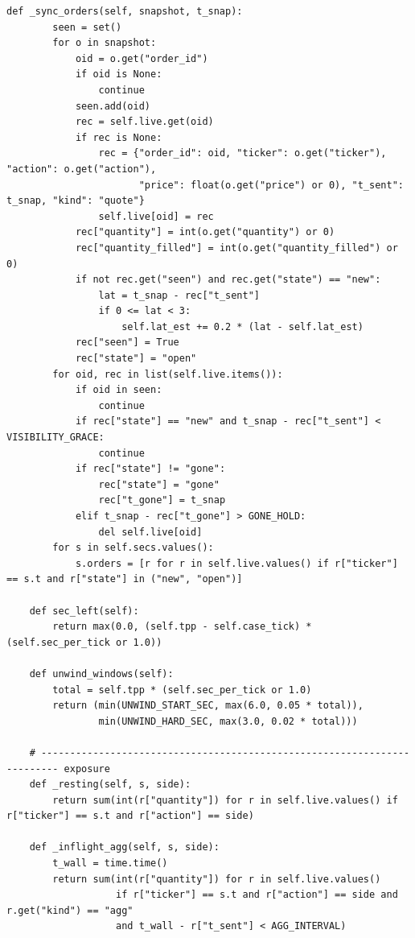 \begin{lstlisting}[style=algocode]
    def _sync_orders(self, snapshot, t_snap):
        seen = set()
        for o in snapshot:
            oid = o.get("order_id")
            if oid is None:
                continue
            seen.add(oid)
            rec = self.live.get(oid)
            if rec is None:
                rec = {"order_id": oid, "ticker": o.get("ticker"), "action": o.get("action"),
                       "price": float(o.get("price") or 0), "t_sent": t_snap, "kind": "quote"}
                self.live[oid] = rec
            rec["quantity"] = int(o.get("quantity") or 0)
            rec["quantity_filled"] = int(o.get("quantity_filled") or 0)
            if not rec.get("seen") and rec.get("state") == "new":
                lat = t_snap - rec["t_sent"]
                if 0 <= lat < 3:
                    self.lat_est += 0.2 * (lat - self.lat_est)
            rec["seen"] = True
            rec["state"] = "open"
        for oid, rec in list(self.live.items()):
            if oid in seen:
                continue
            if rec["state"] == "new" and t_snap - rec["t_sent"] < VISIBILITY_GRACE:
                continue
            if rec["state"] != "gone":
                rec["state"] = "gone"
                rec["t_gone"] = t_snap
            elif t_snap - rec["t_gone"] > GONE_HOLD:
                del self.live[oid]
        for s in self.secs.values():
            s.orders = [r for r in self.live.values() if r["ticker"] == s.t and r["state"] in ("new", "open")]

    def sec_left(self):
        return max(0.0, (self.tpp - self.case_tick) * (self.sec_per_tick or 1.0))

    def unwind_windows(self):
        total = self.tpp * (self.sec_per_tick or 1.0)
        return (min(UNWIND_START_SEC, max(6.0, 0.05 * total)),
                min(UNWIND_HARD_SEC, max(3.0, 0.02 * total)))

    # ------------------------------------------------------------------------- exposure
    def _resting(self, s, side):
        return sum(int(r["quantity"]) for r in self.live.values() if r["ticker"] == s.t and r["action"] == side)

    def _inflight_agg(self, s, side):
        t_wall = time.time()
        return sum(int(r["quantity"]) for r in self.live.values()
                   if r["ticker"] == s.t and r["action"] == side and r.get("kind") == "agg"
                   and t_wall - r["t_sent"] < AGG_INTERVAL)


\end{lstlisting}
